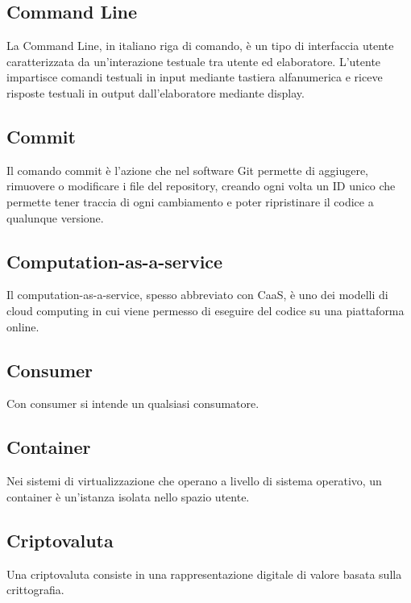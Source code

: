 \subsection*{Command Line}
La Command Line, in italiano riga di comando, è un tipo di interfaccia utente caratterizzata da un'interazione testuale tra utente ed elaboratore. L'utente impartisce comandi testuali in input mediante tastiera alfanumerica e riceve risposte testuali in output dall'elaboratore mediante display.

\subsection*{Commit}
Il comando commit è l'azione che nel software Git permette di aggiugere, rimuovere o modificare i file del repository, creando ogni volta un ID unico che permette tener traccia di ogni cambiamento e poter ripristinare il codice a qualunque versione.

\subsection*{Computation-as-a-service}
Il computation-as-a-service, spesso abbreviato con CaaS, è uno dei modelli di cloud computing in cui viene permesso di eseguire del codice su una piattaforma online.

\subsection*{Consumer}
Con consumer si intende un qualsiasi consumatore.

\subsection*{Container}
Nei sistemi di virtualizzazione che operano a livello di sistema operativo, un container è un'istanza isolata nello spazio utente.

\subsection*{Criptovaluta}
Una criptovaluta consiste in una rappresentazione digitale di valore basata sulla crittografia.

